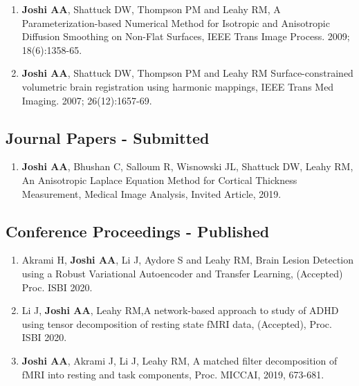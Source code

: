 \documentclass[overlapped,line,letterpaper]{res}
\begin{document}
\begin{resume}
\begin{enumerate}
    \item \textbf{Joshi AA}, Shattuck DW, Thompson PM and Leahy RM, {A Parameterization-based Numerical Method for Isotropic and Anisotropic Diffusion Smoothing on Non-Flat Surfaces}, IEEE Trans Image Process. 2009; 18(6):1358-65.

    \item \textbf{Joshi AA}, Shattuck DW, Thompson PM and Leahy RM {Surface-constrained volumetric brain registration using harmonic mappings}, IEEE Trans Med Imaging. 2007; 26(12):1657-69.
\end{enumerate}



\subsection{Journal Papers - Submitted}
\begin{enumerate}
\item \textbf{Joshi AA}, Bhushan C, Salloum R, Wisnowski JL, Shattuck DW, Leahy RM, {An Anisotropic Laplace Equation Method for Cortical Thickness Measurement}, Medical Image Analysis, Invited Article, 2019.

\end{enumerate}

\subsection{Conference Proceedings - Published}
\begin{enumerate}

    \item Akrami H, \textbf{Joshi AA}, Li J, Aydore S and Leahy RM, {Brain Lesion Detection using a Robust Variational Autoencoder and Transfer Learning}, (Accepted) Proc. ISBI 2020.

    \item Li J, \textbf{Joshi AA}, Leahy RM,{A network-based approach to study of ADHD using tensor decomposition of resting state fMRI data}, (Accepted), Proc. ISBI 2020.
    
    \item \textbf{Joshi AA}, Akrami J, Li J, Leahy RM, {A matched filter decomposition of fMRI into resting and task components}, Proc. MICCAI, 2019, 673-681.


\end{enumerate}
\end{resume}
\end{document}
